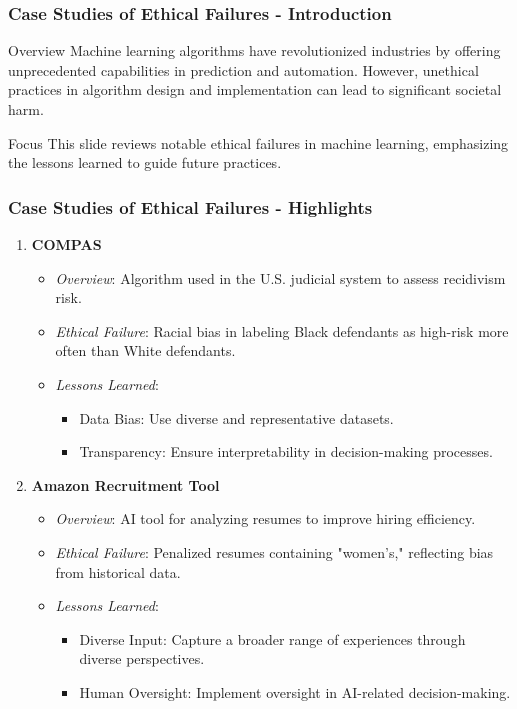 \documentclass[aspectratio=169]{beamer}
\begin{document}
\begin{frame}[fragile]
    \frametitle{Case Studies of Ethical Failures - Introduction}
    \begin{block}{Overview}
        Machine learning algorithms have revolutionized industries by offering unprecedented capabilities in prediction and automation. However, unethical practices in algorithm design and implementation can lead to significant societal harm.
    \end{block}
    \begin{block}{Focus}
        This slide reviews notable ethical failures in machine learning, emphasizing the lessons learned to guide future practices.
    \end{block}
\end{frame}

\begin{frame}[fragile]
    \frametitle{Case Studies of Ethical Failures - Highlights}
    \begin{enumerate}
        \item \textbf{COMPAS}
        \begin{itemize}
            \item \textit{Overview}: Algorithm used in the U.S. judicial system to assess recidivism risk.
            \item \textit{Ethical Failure}: Racial bias in labeling Black defendants as high-risk more often than White defendants.
            \item \textit{Lessons Learned}:
            \begin{itemize}
                \item Data Bias: Use diverse and representative datasets.
                \item Transparency: Ensure interpretability in decision-making processes.
            \end{itemize}
        \end{itemize}

        \item \textbf{Amazon Recruitment Tool}
        \begin{itemize}
            \item \textit{Overview}: AI tool for analyzing resumes to improve hiring efficiency.
            \item \textit{Ethical Failure}: Penalized resumes containing "women’s," reflecting bias from historical data.
            \item \textit{Lessons Learned}:
            \begin{itemize}
                \item Diverse Input: Capture a broader range of experiences through diverse perspectives.
                \item Human Oversight: Implement oversight in AI-related decision-making.
            \end{itemize}
        \end{itemize}
    \end{enumerate}
\end{frame}
\end{document}
